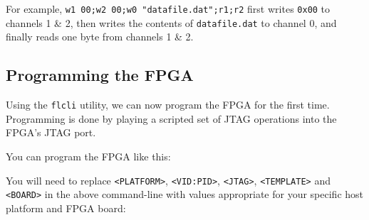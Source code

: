 For example, \texttt{w1 00;w2 00;w0 "datafile.dat";r1;r2} first writes \texttt{0x00} to channels 1 \& 2, then writes the contents of \texttt{datafile.dat} to channel 0, and finally reads one byte from channels 1 \& 2.

\newpage
\subsection{Programming the FPGA}
Using the \texttt{flcli} utility, we can now program the FPGA for the first time. Programming is done by playing a scripted set of JTAG operations into the FPGA's JTAG port.


You can program the FPGA like this:


You will need to replace \texttt{<PLATFORM>}, \texttt{<VID:PID>}, \texttt{<JTAG>}, \texttt{<TEMPLATE>} and \texttt{<BOARD>} in the above command-line with values appropriate for your specific host platform and FPGA board:

